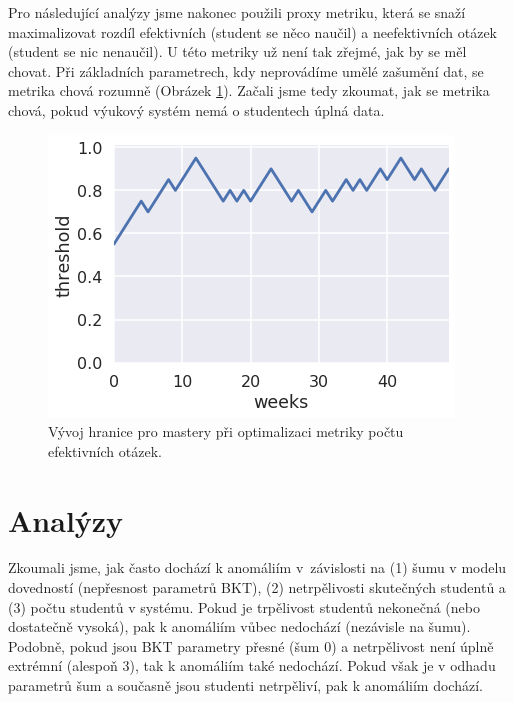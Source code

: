 \documentclass[twocolumn,10pt,cleanfoot]{asme2ej}
\begin{document}
Pro následující analýzy jsme nakonec použili proxy metriku, která se snaží maximalizovat rozdíl efektivních (student se něco naučil) a neefektivních otázek (student se nic nenaučil).
U této metriky už není tak zřejmé, jak by se měl chovat. Při základních parametrech, kdy neprovádíme umělé zašumění dat, se metrika chová rozumně
(Obrázek \ref{fig:thresholds-effective-tasks}).
Začali jsme tedy zkoumat, jak se metrika chová, pokud výukový systém nemá o studentech úplná data.

\begin{figure}[htb]
\centering
\includegraphics[width=\columnwidth]{img/thresholds-effective-tasks}
\caption{Vývoj hranice pro mastery při optimalizaci metriky počtu efektivních otázek.}
\label{fig:thresholds-effective-tasks}
\end{figure}

\section{Analýzy}

Zkoumali jsme, jak často dochází k anomáliím v~závislosti na (1) šumu v modelu dovedností (nepřesnost parametrů BKT), (2) netrpělivosti skutečných studentů a (3) počtu studentů v systému. Pokud je trpělivost studentů nekonečná (nebo dostatečně vysoká), pak k anomáliím vůbec nedochází (nezávisle na šumu). Podobně, pokud jsou BKT parametry přesné (šum 0) a netrpělivost není úplně extrémní (alespoň 3), tak k anomáliím také nedochází. Pokud však je v odhadu parametrů šum a současně jsou studenti netrpěliví, pak k anomáliím dochází.
\end{document}
